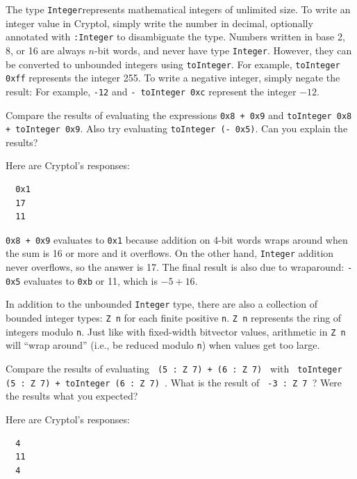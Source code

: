 

The type \texttt{Integer}\indTheIntegerType represents mathematical
integers of unlimited size. To write an integer value in Cryptol,
simply write the number in decimal, optionally annotated with
\texttt{:Integer} to disambiguate the type. Numbers written in base 2,
8, or 16 are always $n$-bit words, and never have type
\texttt{Integer}. However, they can be converted to unbounded integers
using \texttt{toInteger}. For example, \texttt{toInteger 0xff}
represents the integer 255. To write a negative integer, simply negate
the result: For example, \texttt{-12} and \texttt{- toInteger 0xc}
represent the integer $-12$.

\begin{Exercise}\label{ex:int:1}
  Compare the results of evaluating the expressions \texttt{0x8 + 0x9}
  and \texttt{toInteger 0x8 + toInteger 0x9}. Also try evaluating
  \texttt{toInteger (- 0x5)}. Can you explain the results?
\end{Exercise}
\begin{Answer}
Here are Cryptol's responses:
\begin{Verbatim}
  0x1
  17
  11
\end{Verbatim}
\texttt{0x8 + 0x9} evaluates to \texttt{0x1} because addition on 4-bit
words wraps around when the sum is 16 or more and it overflows. On the
other hand, \texttt{Integer} addition never overflows, so the answer
is 17. The final result is also due to wraparound: \texttt{- 0x5}
evaluates to \texttt{0xb} or 11, which is $-5 + 16$.
\end{Answer}

In addition to the unbounded \texttt{Integer} type, there are also a
collection of bounded integer types: \texttt{Z n} for each finite
positive \texttt{n}.  \texttt{Z n} represents the ring of integers modulo \texttt{n}.
Just like with fixed-width bitvector values, arithmetic in
\texttt{Z n} will ``wrap around'' (i.e., be reduced modulo \texttt{n})
when values get too large.
\begin{Exercise}\label{ex:int:2}
  Compare the results of evaluating \texttt{ (5 : Z 7) + (6 : Z 7) }
  with \texttt{ toInteger (5 : Z 7) + toInteger (6 : Z 7) }.
  What is the result of \texttt{ -3 : Z 7 }?
  Were the results what you expected?
\end{Exercise}  
\begin{Answer}
Here are Cryptol's responses:
\begin{Verbatim}
  4
  11
  4
\end{Verbatim}
\end{Answer}

